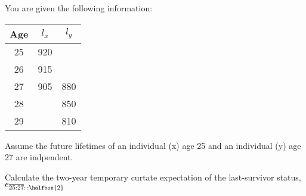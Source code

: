 You are given the following information:
\begin{description}
\bull { \ }

     \begin{center}\begin{tabular}{|c|c|c|} \hline
      Age & $l_x$ & $l_y$   \\ \hline
      25 & 920   &       \\ \hline
      26 & 915   &       \\ \hline
      27 & 905   & 880   \\ \hline
      28 &       & 850   \\ \hline
      29 &       & 810   \\ \hline
     \end{tabular}\end{center}
\bull Assume the future lifetimes of an individual (x) age 25 and an individual (y) age 27 are indpendent.
\end{description}
Calculate the two-year temporary curtate expectation of the last-survivor status, $e_{\overline{25:27}:\,:\halfbox{2}}$


 


